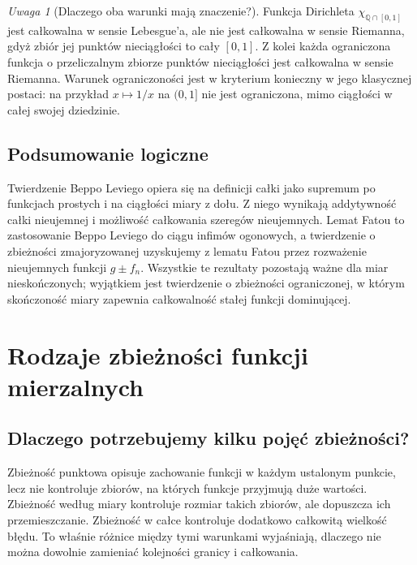 \documentclass[11pt,a4paper,oneside]{book}
\numberwithin{equation}{chapter}
\theoremstyle{plain}
\theoremstyle{definition}
\theoremstyle{remark}
\newtheorem{uwaga}[twierdzenie]{Uwaga}
\begin{document}
\begin{uwaga}[Dlaczego oba warunki mają znaczenie?]
Funkcja Dirichleta $\chi_{\mathbb Q\cap[0,1]}$
jest całkowalna w sensie Lebesgue'a, ale
nie jest całkowalna w sensie Riemanna, gdyż
zbiór jej punktów nieciągłości to cały $[0,1]$.
Z kolei każda ograniczona funkcja o przeliczalnym
zbiorze punktów nieciągłości jest całkowalna
w sensie Riemanna. Warunek ograniczoności jest
w kryterium konieczny w jego klasycznej postaci:
na przykład $x\mapsto1/x$ na $(0,1]$ nie jest
ograniczona, mimo ciągłości w całej swojej dziedzinie.
\end{uwaga}

\section{Podsumowanie logiczne}

Twierdzenie Beppo Leviego opiera się na definicji
całki jako supremum po funkcjach prostych i na
ciągłości miary z dołu. Z niego wynikają
addytywność całki nieujemnej i możliwość całkowania
szeregów nieujemnych. Lemat Fatou to zastosowanie
Beppo Leviego do ciągu infimów ogonowych, a twierdzenie
o zbieżności zmajoryzowanej uzyskujemy z lematu Fatou
przez rozważenie nieujemnych funkcji $g\pm f_n$.
Wszystkie te rezultaty pozostają ważne dla miar
nieskończonych; wyjątkiem jest twierdzenie o zbieżności
ograniczonej, w którym skończoność miary
zapewnia całkowalność stałej funkcji dominującej.



\chapter{Rodzaje zbieżności funkcji mierzalnych}
\label{ch:rodzaje-zbieznosci}

\section{Dlaczego potrzebujemy kilku pojęć zbieżności?}

Zbieżność punktowa opisuje zachowanie funkcji w każdym ustalonym
punkcie, lecz nie kontroluje zbiorów, na których funkcje przyjmują
duże wartości. Zbieżność według miary kontroluje rozmiar takich
zbiorów, ale dopuszcza ich przemieszczanie. Zbieżność w całce
kontroluje dodatkowo całkowitą wielkość błędu. To właśnie różnice
między tymi warunkami wyjaśniają, dlaczego nie można dowolnie
zamieniać kolejności granicy i całkowania.
\end{document}
